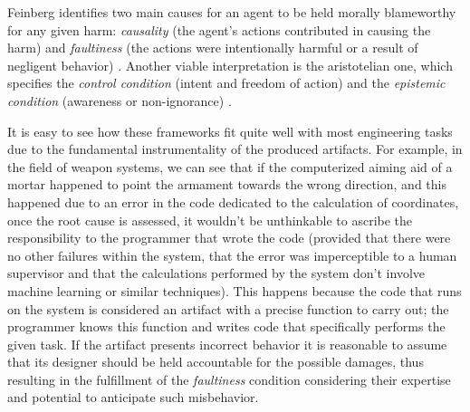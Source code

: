 Feinberg identifies two main causes for an agent to be held morally blameworthy for any given harm: \textit{causality} (the agent's actions contributed in causing the harm) and \textit{faultiness} (the actions were intentionally harmful or a result of negligent behavior) \parencite{FEISC}.
Another viable interpretation is the aristotelian one, which specifies the \textit{control condition} (intent and freedom of action) and the \textit{epistemic condition} (awareness or non-ignorance) \parencite{FISRAC}.

It is easy to see how these frameworks fit quite well with most engineering tasks due to the fundamental instrumentality of the produced artifacts.
For example, in the field of weapon systems, we can see that if the computerized aiming aid of a mortar happened to point the armament towards the wrong direction, and this happened due to an error in the code dedicated to the calculation of coordinates, once the root cause is assessed, it wouldn't be unthinkable to ascribe the responsibility to the programmer that wrote the code (provided that there were no other failures within the system, that the error was imperceptible to a human supervisor and that the calculations performed by the system don't involve machine learning or similar techniques).
This happens because the code that runs on the system is considered an artifact with a precise function to carry out; the programmer knows this function and writes code that specifically performs the given task.
If the artifact presents incorrect behavior it is reasonable to assume that its designer should be held accountable for the possible damages, thus resulting in the fulfillment of the \textit{faultiness} condition considering their expertise and potential to anticipate such misbehavior.

